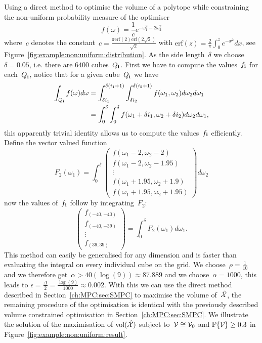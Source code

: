 \begin{example}{Using a direct method to optimise the volume of a polytope while constraining the non-uniform probability measure of the optimiser}
%
\[
	f(\omega) = \frac{1}{c}e^{-\omega_1^2-2\omega_2^2}
\]
%
where~$c$ denotes the constant~$c=\frac{\pi  \text{erf}(2) \text{erf}\left(2 \sqrt{2}\right)}{\sqrt{2}}$ with $\text{erf}(z) = \frac{2}{\pi}\int_0^z e^{-x^2}dx$, see Figure~\ref{fig:example:non:uniform:distribution}.
%
As the side length~$\delta$ we choose~$\delta=0.05$, i.e. there are $6400$ cubes~$Q_{\mathbf{i}}$.
%
First we have to compute the values~$f_{\mathbf{i}}$ for each~$Q_{\mathbf{i}}$, notice that for a given cube~$Q_{\mathbf{i}}$ we have
%
\[
\begin{aligned}
\int_{Q_{\mathbf{i}}}f(\omega)d\omega&=\int_{\delta i_1}^{\delta(i_1+1)}\int_{\delta i_2}^{\delta(i_2+1)}f(\omega_1,\omega_2)d\omega_2d\omega_1\\
&=\int_0^\delta\int_0^\delta f(\omega_1+\delta i_1,\omega_2+\delta i_2)d\omega_2d\omega_1,
\end{aligned}
\]
%
this apparently trivial identity allows us to compute the values~$f_{\mathbf{i}}$ efficiently.
%
Define the vector valued function
%
\[
F_2(\omega_1) = \int_0^\delta\begin{pmatrix}f(\omega_1-2,\omega_2-2)\\
f(\omega_1-2,\omega_2-1.95)\\
\vdots\\
f(\omega_1+1.95,\omega_2+1.9)\\
f(\omega_1+1.95,\omega_2+1.95)\end{pmatrix}d\omega_2
\]
%
now the values of~$f_{\mathbf{i}}$ follow by integrating~$F_2$:
%
\[
	\begin{pmatrix}
	f_{(-40,-40)}\\
	f_{(-40,-39)}\\
	\vdots\\
	f_{(39,39)}
	\end{pmatrix} = \int_0^\delta F_2(\omega_1)d\omega_1.
\]
%
This method can easily be generalised for any dimension and is faster than evaluating the integral on every individual cube on the grid.
%
We choose~$\rho=\frac{1}{10}$ and we therefore get~$\alpha>40(\log(9))\approx87.889$ and we choose~$\alpha=1000$, this leads to $\epsilon=\frac{\Delta}{2}=\frac{\log(9)}{1000}\approx0.002$.
%
With this we can use the direct method described in Section~\ref{ch:MPC:sec:SMPC} to maximise the volume of~$\hat{\mathcal X}$, the remaining procedure of the optimisation is identical with the previously described volume constrained optimisation in Section~\ref{ch:MPC:sec:SMPC}.
%
We illustrate the solution of the maximisation of $\text{vol}(\hat{\mathcal X})$ subject to~$\mathcal V\cong\mathcal V_0$ and $\mathbb P\{\mathcal V\}\geq0.3$ in Figure~\ref{fig:example:non:uniform:result}.

\end{example}
